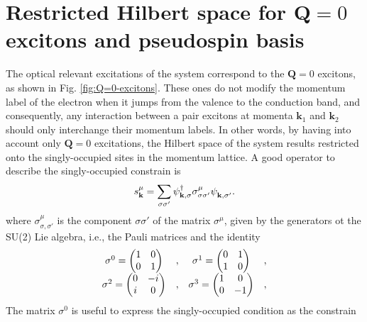 \documentclass[english,aps,prd,nofootinbib,twocolumn]{revtex4-1}
\begin{document}
\section{Restricted Hilbert space for $\mathbf{Q}=0$ excitons and pseudospin basis}

The optical relevant excitations of the system correspond to the $\mathbf{Q}=0$ excitons, as shown in Fig. \ref{fig:Q=0-excitons}. These ones do not modify the momentum label of the electron when it jumps from the valence to the conduction band, and consequently, any interaction between a pair excitons at momenta $\mathbf{k}_{1}$ and $\mathbf{k}_{2}$ should only interchange their momentum labels. In other words, by having into account only $\mathbf{Q}=0$ excitations, the Hilbert space of the system results restricted onto the singly-occupied sites in the momentum lattice. A good operator to describe the singly-occupied constrain is
\begin{equation}
\label{eq:SU(2)-spin-operator}
s^{\mu}_{\mathbf{k }} = \sum_{\sigma \sigma'} 
\psi_{\mathbf{k ,\sigma }}^{\textcolor{black}{\dagger}}
\sigma^{\mu }_{\sigma \sigma'}
\psi_{\mathbf{k ,\sigma'}}^{\textcolor{white}{\dagger}}.
\end{equation}
where $\sigma^{\mu }_{\sigma  ,\sigma '}$ is the component $\sigma \sigma '$ of the matrix $\sigma^{\mu }$, given by the generators ot the SU(2) Lie algebra, i.e., the Pauli matrices and the identity
\begin{equation}
\begin{matrix}
\sigma^{0}_{\textcolor{white}{,}} = 
\begin{pmatrix}
1	&	0	\\	0	&	1
\end{pmatrix}	&	,	&	
\sigma^{1}_{\textcolor{white}{,}} = 
\begin{pmatrix}
0	&	1	\\	1	&	0
\end{pmatrix}	&	, \\
\sigma^{2}_{\textcolor{white}{,}} = 
\begin{pmatrix}
0	&	-i	\\	i	&	0
\end{pmatrix}	&	,	&	
\sigma^{3}_{\textcolor{white}{,}} = 
\begin{pmatrix}
1	&	0	\\	0	&	-1
\end{pmatrix}	&	,
\end{matrix}
\end{equation}
The matrix $\sigma^{0}$ is useful to express the singly-occupied condition as the constrain
\end{document}
